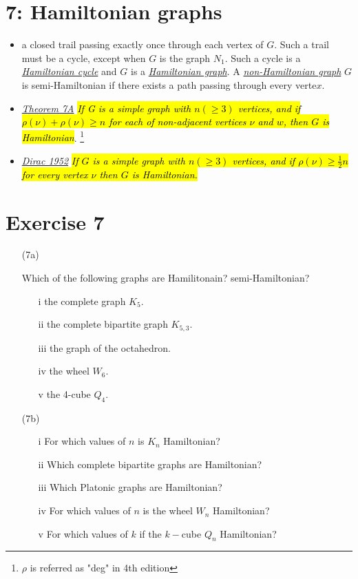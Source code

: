 \documentclass[12pt,a4paper, twocolumn]{article}
\begin{document}
\section*{7: Hamiltonian graphs}
\begin{itemize}
		\item a closed trail passing exactly once through each vertex of $G$. Such a trail must be a cycle, except when $G$ is the graph $N_1$. Such a cycle is a \underline{\emph{\color{magenta} Hamiltonian cycle}} and $G$ is a \underline{\emph{\color{magenta} Hamiltonian graph}}. A \underline{\emph{\color{magenta} non-Hamiltonian graph}} $G$ is semi-Hamiltonian if there exists a path passing through every verte$x$.
		\item \underline{\emph{\color{magenta} Theorem 7A}} \hl{\emph{If G is a simple graph with $n(\geq3)$ vertices, and if $\rho(\nu) + \rho(\nu) \geq n$ for each of non-adjacent vertices $\nu$ and $w$, then $G$ is Hamiltonian}}. \footnote{$\rho$ is referred as "deg" in 4th edition} 
		\item \underline{\emph{\color{magenta} Dirac 1952}} \hl{\emph{If $G$ is a simple graph with $n(\geq3)$ vertices, and if $\rho(\nu) \geq \frac{1}{2} n$ for every vertex $\nu$ then $G$ is Hamiltonian.}}
\end{itemize}

\section*{Exercise 7}
\begin{itemize}
		\item[(7a)] {\color{blue} Which of the following graphs are Hamilitonain? semi-Hamiltonian?
			\begin{itemize}
				\item[i] the complete graph $K_5$.
				\item[ii] the complete bipartite graph $K_{5,3}$.
				\item[iii] the graph of the octahedron.
				\item[iv] the wheel $W_6$.
				\item[v] the 4-cube $Q_4$.
			\end{itemize}
			}
			\hsplit
	\item[(7b)] {\color{blue}
			\begin{itemize}
				\item[i] For which values of $n$ is $K_n$ Hamiltonian?
				\item[ii] Which complete bipartite graphs are Hamiltonian?
				\item[iii] Which Platonic graphs are Hamiltonian?
				\item[iv] For which values of $n$ is the wheel $W_n$ Hamiltonian?
				\item[v] For which values of $k$ if the $k-$cube $Q_n$ Hamiltonian?
			\end{itemize}	
			}
\end{itemize}
\end{document}
